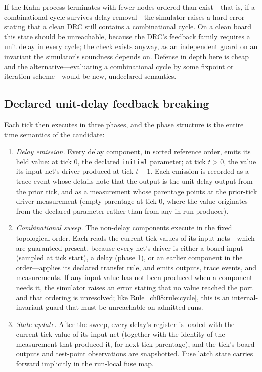 \begin{ruleenv}\label{ch08:rule:cycle}
If the Kahn process terminates with fewer nodes ordered than exist---that is, if a combinational cycle survives delay removal---the simulator raises a hard error stating that a clean DRC still contains a combinational cycle. On a clean board this state should be unreachable, because the DRC's feedback family requires a unit delay in every cycle; the check exists anyway, as an independent guard on an invariant the simulator's soundness depends on. Defense in depth here is cheap and the alternative---evaluating a combinational cycle by some fixpoint or iteration scheme---would be new, undeclared semantics.
\end{ruleenv}

\subsection{Declared unit-delay feedback breaking}

Each tick then executes in three phases, and the phase structure is the entire time semantics of the candidate:

\begin{enumerate}
\item \emph{Delay emission.} Every delay component, in sorted reference order, emits its held value: at tick $0$, the declared \texttt{initial} parameter; at tick $t > 0$, the value its input net's driver produced at tick $t-1$. Each emission is recorded as a trace event whose details note that the output is the unit-delay output from the prior tick, and as a measurement whose parentage points at the prior-tick driver measurement (empty parentage at tick $0$, where the value originates from the declared parameter rather than from any in-run producer).
\item \emph{Combinational sweep.} The non-delay components execute in the fixed topological order. Each reads the current-tick values of its input nets---which are guaranteed present, because every net's driver is either a board input (sampled at tick start), a delay (phase 1), or an earlier component in the order---applies its declared transfer rule, and emits outputs, trace events, and measurements. If any input value has not been produced when a component needs it, the simulator raises an error stating that no value reached the port and that ordering is unresolved; like Rule~\ref{ch08:rule:cycle}, this is an internal-invariant guard that must be unreachable on admitted runs.
\item \emph{State update.} After the sweep, every delay's register is loaded with the current-tick value of its input net (together with the identity of the measurement that produced it, for next-tick parentage), and the tick's board outputs and test-point observations are snapshotted. Fuse latch state carries forward implicitly in the run-local fuse map.
\end{enumerate}

